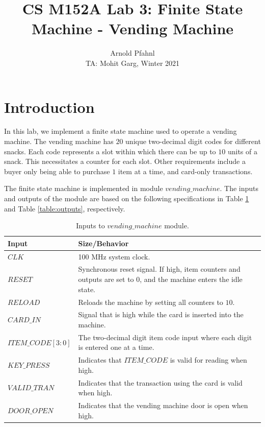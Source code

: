 \documentclass{article}
\title{CS M152A Lab 3: Finite State Machine - Vending Machine}
\author{Arnold Pfahnl \\ \small{TA: Mohit Garg, Winter 2021}}
\date{}
\begin{document}
\maketitle
\tableofcontents

\section{Introduction}
In this lab, we implement a finite state machine used to operate a vending machine. The vending machine has $20$ unique two-decimal digit codes for different snacks. Each code represents a slot within which there can be up to $10$ units of a snack. This necessitates a counter for each slot. Other requirements include a buyer only being able to purchase $1$ item at a time, and card-only transactions.

The finite state machine is implemented in module $vending\_machine$. The inputs and outputs of the module are based on the following specifications in Table \ref{table:inputs} and Table \ref{table:outputs}, respectively.

\begin{table}[H]
    \centering
    \begin{tabular}{ | m{4cm} | m{8cm} | }
        \hline
        \textbf{Input} & \textbf{Size/Behavior} \\
        \hline
        $CLK$ & 100 MHz system clock. \\
        \hline
        $RESET$ & Synchronous reset signal. If high, item counters and outputs are set to $0$, and the machine enters the idle state. \\ 
        \hline
        $RELOAD$ & Reloads the machine by setting all counters to $10$. \\
        \hline
        $CARD\_IN$ & Signal that is high while the card is inserted into the machine. \\
        \hline
        $ITEM\_CODE[3:0]$ & The two-decimal digit item code input where each digit is entered one at a time. \\
        \hline
        $KEY\_PRESS$ & Indicates that $ITEM\_CODE$ is valid for reading when high. \\
        \hline
        $VALID\_TRAN$ & Indicates that the transaction using the card is valid when high. \\
        \hline 
        $DOOR\_OPEN$ & Indicates that the vending machine door is open when high. \\
        \hline
    \end{tabular}
    \caption{Inputs to $vending\_machine$ module.}
    \label{table:inputs}
\end{table}
\end{document}
